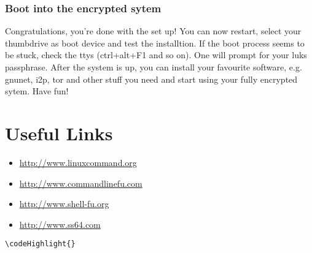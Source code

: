 \documentclass[12pt,a4paper]{article}
\begin{document}
\subsubsection{Boot into the encrypted sytem}
Congratulations, you're done with the set up! You can now restart, select your thumbdrive as boot device and test the installtion. If the boot process seems to be stuck, check the ttys (ctrl+alt+F1 and so on). One will prompt for your luks passphrase. After the system is up, you can install your favourite software, e.g. gnunet, i2p, tor and other stuff you need and start using your fully encrypted sytem. Have fun!

\section{Useful Links}
\begin{itemize}
\item{\url{http://www.linuxcommand.org}}
\item{\url{http://www.commandlinefu.com}}
\item{\url{http://www.shell-fu.org}}
\item{\url{http://www.ss64.com}}
\end{itemize}
\begin{Verbatim}[commandchars=\\\{\}]
\codeHighlight{}
\end{Verbatim}
\end{document}
